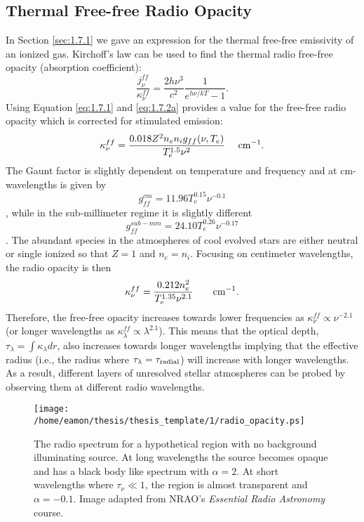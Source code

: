 \subsection{Thermal Free-free Radio Opacity}\label{sec:1.8.3}
In Section \ref{sec:1.7.1} we gave an expression for the thermal free-free emissivity of an ionized gas. Kirchoff's law can be used to find the thermal radio free-free opacity (absorption coefficient):
\begin{equation}
\frac{j_{\nu}^{ff}}{\kappa _{\nu}^{ff}}=\frac{2h\nu ^3}{c^2}\frac{1}{e^{h\nu /kT}-1}.
\end{equation}
Using Equation \ref{eq:1.7.1} and \ref{eq:1.7.2a} provides a value for the free-free radio opacity which is corrected for stimulated emission:
\begin{equation}
\kappa _{\nu}^{ff} = \frac{0.018Z^2n_{e}n_{i}g_{ff}(\nu ,T_{e})}{T_{e}^{1.5}\nu ^{2}}\ \ \ \ \rm{cm^{-1}}.
\end{equation}
The Gaunt factor is slightly dependent on temperature and frequency and at cm-wavelengths is given by
\begin{equation}
g_{ff}^{cm}=11.96T_{e}^{0.15}\nu ^{-0.1}
\end{equation}
\citep{Altenhoff_1960}, while in the  sub-millimeter regime it is slightly different
\begin{equation}
g_{ff}^{sub-mm}=24.10T_{e}^{0.26}\nu ^{-0.17}
\end{equation}
\citep{harper_2013,hummer_1988}. The abundant species in the atmospheres of cool evolved stars are either neutral or single ionized so that $Z=1$ and $n_{e} = n_{i}$. Focusing on centimeter wavelengths, the radio opacity is then
\begin{equation}\label{eq:1.22}
\kappa _{\nu}^{ff} = \frac{0.212n_{e}^2}{T_{e}^{1.35}\nu ^{2.1}}\ \ \ \ \ \ \rm{cm}^{-1}.
\end{equation}
Therefore, the free-free opacity increases towards lower frequencies as $\kappa _{\nu}^{ff} \propto \nu ^{-2.1}$ (or longer wavelengths as $\kappa _{\lambda}^{ff} \propto \lambda ^{2.1}$). This means that the optical depth, $\tau _{\lambda}= \int \kappa _{\lambda} dr$, also increases towards longer wavelengths implying that the effective radius (i.e., the radius where $\tau _{\lambda} = \tau _{\rm{radial}}$) will increase with longer wavelengths. As a result, different layers of unresolved stellar atmospheres can be probed by observing them at different radio wavelengths.

\begin{figure}[ht!]
\centering 
          \texttt{[image: /home/eamon/thesis/thesis\_template/1/radio\_opacity.ps]}
\caption[ region radio spectrum]{The radio spectrum for a hypothetical  region with no background illuminating source. At long wavelengths the source becomes opaque and has a black body like spectrum with $\alpha = 2$. At short wavelengths where $\tau _{\nu} \ll 1$, the  region is almost transparent and $\alpha = -0.1$. Image adapted from NRAO's \textit{Essential Radio Astronomy} course.}
\label{fig:1.5.3}
\end{figure}

